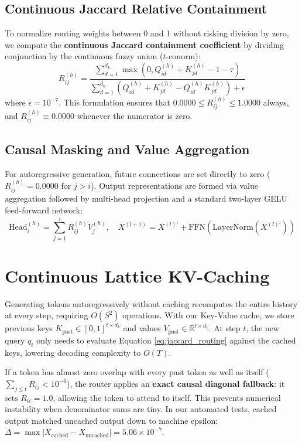 \subsection{Continuous Jaccard Relative Containment}
To normalize routing weights between 0 and 1 without risking division by zero, we compute the \textbf{continuous Jaccard containment coefficient} by dividing conjunction by the continuous fuzzy union ($t$-conorm):
\begin{equation}
\label{eq:jaccard_routing}
R_{ij}^{(h)} = \frac{\sum_{d=1}^{d_k} \max(0, Q_{id}^{(h)} + K_{jd}^{(h)} - 1 - \tau)}{\sum_{d=1}^{d_k} \left(Q_{id}^{(h)} + K_{jd}^{(h)} - Q_{id}^{(h)} K_{jd}^{(h)}\right) + \epsilon}
\end{equation}
where $\epsilon = 10^{-7}$. This formulation ensures that $0.0000 \le R_{ij}^{(h)} \le 1.0000$ always, and $R_{ij}^{(h)} \equiv 0.0000$ whenever the numerator is zero.

\subsection{Causal Masking and Value Aggregation}
For autoregressive generation, future connections are set directly to zero ($R_{ij}^{(h)} = 0.0000$ for $j > i$). Output representations are formed via value aggregation followed by multi-head projection and a standard two-layer GELU feed-forward network:
\begin{equation}
\text{Head}^{(h)}_i = \sum_{j=1}^i R_{ij}^{(h)} V_j^{(h)}, \quad X^{(l+1)} = X^{(l)\prime} + \text{FFN}(\text{LayerNorm}(X^{(l)\prime}))
\end{equation}

\section{Continuous Lattice KV-Caching}
Generating tokens autoregressively without caching recomputes the entire history at every step, requiring $O(S^2)$ operations. With our Key-Value cache, we store previous keys $K_{\text{past}} \in [0, 1]^{t \times d_k}$ and values $V_{\text{past}} \in \mathbb{R}^{t \times d_v}$. At step $t$, the new query $q_t$ only needs to evaluate Equation \ref{eq:jaccard_routing} against the cached keys, lowering decoding complexity to $O(T)$.

If a token has almost zero overlap with every past token as well as itself ($\sum_{j \le t} R_{tj} < 10^{-6}$), the router applies an \textbf{exact causal diagonal fallback}: it sets $R_{tt} = 1.0$, allowing the token to attend to itself. This prevents numerical instability when denominator sums are tiny. In our automated tests, cached output matched uncached output down to machine epsilon: $\Delta = \max | X_{\text{cached}} - X_{\text{uncached}} | = 5.06 \times 10^{-7}$.
